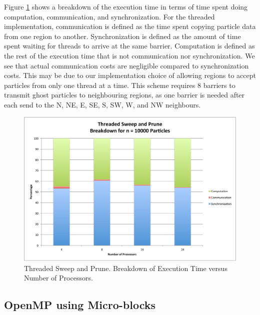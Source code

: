\documentclass[11pt]{article} %
\begin{document}
Figure \ref{plot:thread_breakdown_10000} shows a breakdown of the
execution time in terms of time spent doing computation, communication,
and synchronization. For the threaded implementation, communication
is defined as the time spent copying particle data from one region
to another. Synchronization is defined as the amount of time spent
waiting for threads to arrive at the same barrier. Computation is
defined as the rest of the execution time that is not communication
nor synchronization. We see that actual communication costs are negligible
compared to synchronization costs. This may be due to our implementation
choice of allowing regions to accept particles from only one thread
at a time. This scheme requires 8 barriers to transmit ghost particles
to neighbouring regions, as one barrier is needed after each send
to the N, NE, E, SE, S, SW, W, and NW neighbours. 

\begin{figure}
\begin{centering}
\includegraphics[width=0.5\paperwidth]{figures/thread_breakdown_10000}
\par\end{centering}

\caption{Threaded Sweep and Prune. Breakdown of Execution Time versus Number
of Processors.}
\label{plot:thread_breakdown_10000}
\end{figure}

\subsection{OpenMP using Micro-blocks}
\end{document}
